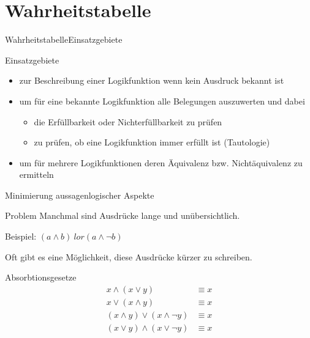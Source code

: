 \documentclass[xelatex,aspectratio=169]{beamer}
\begin{document}
\section{Wahrheitstabelle}

\begin{frame}{Wahrheitstabelle}{Einsatzgebiete}
  \begin{block}{Einsatzgebiete}
    \begin{itemize}
      \item zur Beschreibung einer Logikfunktion wenn kein Ausdruck bekannt ist
      \item um für eine bekannte Logikfunktion alle Belegungen auszuwerten und dabei
            \begin{itemize}
              \item die Erfüllbarkeit oder Nichterfüllbarkeit zu prüfen
              \item zu prüfen, ob eine Logikfunktion immer erfüllt ist (Tautologie)
            \end{itemize}
      \item um für mehrere Logikfunktionen deren Äquivalenz bzw. Nichtäquivalenz zu ermitteln
    \end{itemize}

  \end{block}
\end{frame}

\begin{frame}{Minimierung aussagenlogischer Aspekte}
  \begin{alertblock}{Problem}
    Manchmal sind Ausdrücke lange und unübersichtlich.

    Beispiel: \( (a \land b) \ lor (a \land \lnot b) \)

  \end{alertblock}

  Oft gibt es eine Möglichkeit, diese Ausdrücke kürzer zu schreiben.

  \begin{block}{Absorbtionsgesetze}
    \vspace{-\baselineskip}
    \begin{align*}
      x \land (x \lor y)                 & \equiv x \\
      x \lor (x \land y)                 & \equiv x \\
      (x \land y) \lor (x \land \lnot y) & \equiv x \\
      (x \lor y) \land (x \lor \lnot y)  & \equiv x
    \end{align*}

  \end{block}
\end{frame}
\end{document}
